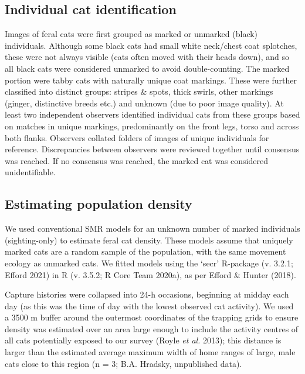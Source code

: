 \documentclass[11pt,a4paper,titlepage,twoside,openright]{style/unimelbthesis}
\begin{document}
\begin{mainmatter}
\hypertarget{individual-cat-identification}{%
\subsection{Individual cat identification}\label{individual-cat-identification}}

Images of feral cats were first grouped as marked or unmarked (black) individuals. Although some black cats had small white neck/chest coat splotches, these were not always visible (cats often moved with their heads down), and so all black cats were considered unmarked to avoid double-counting. The marked portion were tabby cats with naturally unique coat markings. These were further classified into distinct groups: stripes \& spots, thick swirls, other markings (ginger, distinctive breeds etc.) and unknown (due to poor image quality). At least two independent observers identified individual cats from these groups based on matches in unique markings, predominantly on the front legs, torso and across both flanks. Observers collated folders of images of unique individuals for reference. Discrepancies between observers were reviewed together until consensus was reached. If no consensus was reached, the marked cat was considered unidentifiable.

\hypertarget{estimating-population-density}{%
\subsection{Estimating population density}\label{estimating-population-density}}

We used conventional SMR models for an unknown number of marked individuals (sighting-only) to estimate feral cat density. These models assume that uniquely marked cats are a random sample of the population, with the same movement ecology as unmarked cats. We fitted models using the `secr' R-package (v. 3.2.1; Efford 2021) in R (v. 3.5.2; R Core Team 2020a), as per Efford \& Hunter (2018).

Capture histories were collapsed into 24-h occasions, beginning at midday each day (as this was the time of day with the lowest observed cat activity). We used a 3500 m buffer around the outermost coordinates of the trapping grids to ensure density was estimated over an area large enough to include the activity centres of all cats potentially exposed to our survey (Royle \emph{et al.} 2013); this distance is larger than the estimated average maximum width of home ranges of large, male cats close to this region (n = 3; B.A. Hradsky, unpublished data).


\end{mainmatter}
\end{document}
